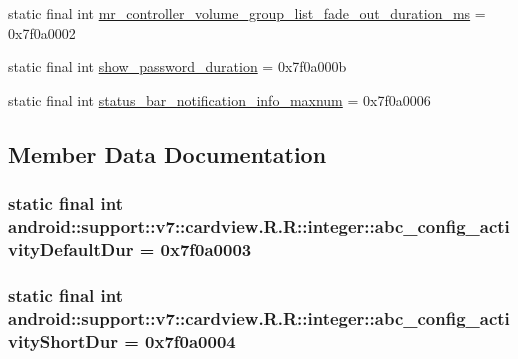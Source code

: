 \begin{CompactItemize}
\item 
static final int \hyperlink{classandroid_1_1support_1_1v7_1_1cardview_1_1_r_1_1integer_b7d965325c2c00912746eb5a03bb2823}{mr\_\-controller\_\-volume\_\-group\_\-list\_\-fade\_\-out\_\-duration\_\-ms} = 0x7f0a0002
\item 
static final int \hyperlink{classandroid_1_1support_1_1v7_1_1cardview_1_1_r_1_1integer_0a73d0a284ef185aa24cbeb5ed2007e9}{show\_\-password\_\-duration} = 0x7f0a000b
\item 
static final int \hyperlink{classandroid_1_1support_1_1v7_1_1cardview_1_1_r_1_1integer_b2f22fbda7a58594cf1aa51d0bfa918c}{status\_\-bar\_\-notification\_\-info\_\-maxnum} = 0x7f0a0006
\end{CompactItemize}


\subsection{Member Data Documentation}
\hypertarget{classandroid_1_1support_1_1v7_1_1cardview_1_1_r_1_1integer_987e9432df90da842c06fd2aa6d5c8bd}{
\subsubsection[{abc\_\-config\_\-activityDefaultDur}]{\setlength{\rightskip}{0pt plus 5cm}static final int android::support::v7::cardview.R.R::integer::abc\_\-config\_\-activityDefaultDur = 0x7f0a0003}}
\label{classandroid_1_1support_1_1v7_1_1cardview_1_1_r_1_1integer_987e9432df90da842c06fd2aa6d5c8bd}


\hypertarget{classandroid_1_1support_1_1v7_1_1cardview_1_1_r_1_1integer_97dd911077184ef8d4fd04ebb0b5b3c5}{
\subsubsection[{abc\_\-config\_\-activityShortDur}]{\setlength{\rightskip}{0pt plus 5cm}static final int android::support::v7::cardview.R.R::integer::abc\_\-config\_\-activityShortDur = 0x7f0a0004}}
\label{classandroid_1_1support_1_1v7_1_1cardview_1_1_r_1_1integer_97dd911077184ef8d4fd04ebb0b5b3c5}


